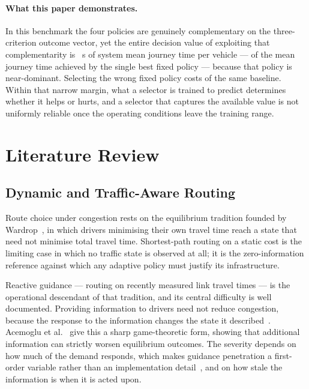 \paragraph{What this paper demonstrates.}
In this benchmark the four policies are genuinely complementary on the
three-criterion outcome vector, yet the entire decision value of exploiting
that complementarity is \NumHeadroom~s of system mean journey time per vehicle
--- \NumHeadroomPct{} of the mean journey time achieved by the single best
fixed policy --- because that policy is near-dominant. Selecting the wrong
fixed policy costs \NumFixedPenPctAbsPOne{} of the same baseline. Within that
narrow margin, what a selector is trained to predict determines whether it
helps or hurts, and a selector that captures the available value is not
uniformly reliable once the operating conditions leave the training range.

\section{Literature Review}
\label{sec:lit}

\subsection{Dynamic and Traffic-Aware Routing}

Route choice under congestion rests on the equilibrium tradition founded by
Wardrop~\cite{wardrop1952}, in which drivers minimising their own travel time
reach a state that need not minimise total travel time. Shortest-path routing
on a static cost is the limiting case in which no traffic state is observed at
all; it is the zero-information reference against which any adaptive policy
must justify its infrastructure.

Reactive guidance --- routing on recently measured link travel times --- is the
operational descendant of that tradition, and its central difficulty is well
documented. Providing information to drivers need not reduce congestion,
because the response to the information changes the state it
described~\cite{arnott1991information}. Acemoglu et
al.~\cite{acemoglu2018braess} give this a sharp game-theoretic form, showing
that additional information can strictly worsen equilibrium outcomes. The
severity depends on how much of the demand responds, which makes guidance
penetration a first-order variable rather than an implementation
detail~\cite{yang1998penetration}, and on how stale the information is when it
is acted upon.

